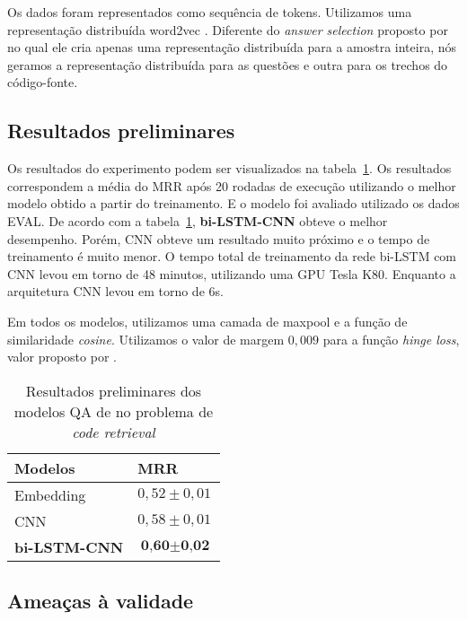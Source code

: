 \documentclass[12pt]{article}
\begin{document}
Os dados foram representados como sequência de tokens. Utilizamos uma representação distribuída word2vec \cite{mikolov-word2vec-2013}. Diferente do \textit{answer selection} proposto por \cite{tan-lstm-qa} no qual ele cria apenas uma representação distribuída para a amostra inteira, nós geramos a representação distribuída para as questões e outra para os trechos do código-fonte.


\subsection{Resultados preliminares}\label{sec:resultados-preliminares}

Os resultados do experimento podem ser visualizados na tabela~\ref{table:resultados-preliminares}. Os resultados correspondem a média do MRR após 20 rodadas de execução utilizando o melhor modelo obtido a partir do treinamento. E o modelo foi avaliado utilizado os dados EVAL. De acordo com a tabela~\ref{table:resultados-preliminares}, \textbf{bi-LSTM-CNN} obteve o melhor desempenho. Porém, CNN obteve um resultado muito próximo e o tempo de treinamento é muito menor. O tempo total de treinamento da rede bi-LSTM com CNN levou em torno de 48 minutos, utilizando uma GPU Tesla K80. Enquanto a arquitetura CNN levou em torno de 6s. 

Em todos os modelos, utilizamos uma camada de maxpool e a função de similaridade \textit{cosine}. Utilizamos o valor de margem $0,009$ para a função \textit{hinge loss}, valor proposto por \cite{feng-answer-selection-2015}.


\begin{table}[h]
\centering
\begin{tabular}{ |p{3cm}|p{3cm}|  }
 \hline
 \textbf{Modelos} & \textbf{MRR}\\
 \hline
 Embedding & $0,52 \pm 0,01$\\
 \hline
 CNN & $0,58 \pm 0,01 $ \\
 \hline
 \textbf{bi-LSTM-CNN} & $\textbf{0,60} \pm \textbf{0,02}$\\
 \hline
\end{tabular}
\caption{Resultados preliminares dos modelos QA de \cite{tan-lstm-qa} no problema de \textit{code retrieval}}
\label{table:resultados-preliminares}
\end{table}

\subsection{Ameaças à validade}
\end{document}
